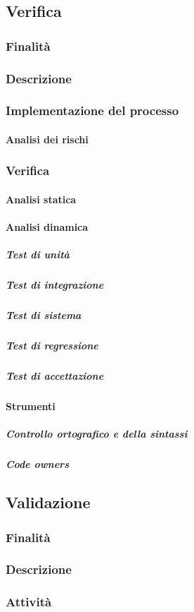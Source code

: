 \documentclass[../norme-di-progetto.tex]{subfiles}
\begin{document}
\subsection{Verifica}
\subsubsection{Finalità}
\subsubsection{Descrizione}
\subsubsection{Implementazione del processo}
\paragraph{Analisi dei rischi}
\subsubsection{Verifica}
\paragraph{Analisi statica}
\paragraph{Analisi dinamica}
\subparagraph{Test di unità}
\subparagraph{Test di integrazione}
\subparagraph{Test di sistema}
\subparagraph{Test di regressione}
\subparagraph{Test di accettazione}
\paragraph{Strumenti}
\subparagraph{Controllo ortografico e della sintassi}
\subparagraph{Code owners}
\subsection{Validazione}
\subsubsection{Finalità}
\subsubsection{Descrizione}
\subsubsection{Attività}
\end{document}
